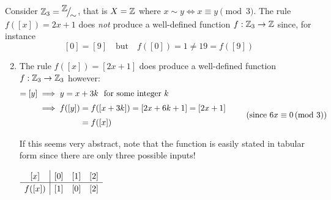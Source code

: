 \begin{examples}{}{}
	\exstart Consider $\mathbb{Z}_3={}^{\textstyle {\mathbb{Z}}}\!\big/_{\textstyle \!{\sim}}$, that is $X=\mathbb{Z}$ where $x\sim y\Longleftrightarrow x\equiv y\pmod 3$. The rule $f([x])=2x+1$ does \emph{not} produce a well-defined function $f:\mathbb{Z}_3\to\mathbb{Z}$ since, for instance
	\[
		[0]=[9]\quad \text{but}\quad f([0])=1\neq 19 =f([9])  
	\]
	
	\begin{enumerate}\setcounter{enumi}{1}
	  \item The rule $f([x])=[2x+1]$ does produce a well-defined function $f:\mathbb{Z}_3\to\mathbb{Z}_3$ however:
	  \begin{align*}
	  	[x]=[y]&\implies y=x+3k\ \ \text{for some integer $k$}\\
	  	&
	  	\begin{array}{@{}r@{}l}
	  		{}\implies f([y])&{}=f([x+3k]) =[2x+6k+1] =[2x+1] \\[3pt]
	  		&{}=f([x])
	  	\end{array}
	  	\tag{since $6x\equiv 0\spmod 3$}
	  \end{align*}
	  \begin{minipage}[t]{0.72\linewidth}\vspace{0pt}
	  	If this seems very abstract, note that the function is easily stated in tabular form since there are only three possible inputs!
	  \end{minipage}
	  \hfill
	  \begin{minipage}[t]{0.25\linewidth}\vspace{-10pt}
	  	\hfill $\def\arraystretch{1.2}
	  	\begin{array}{c|ccc}
	  		[x]&[0]&[1]&[2]\\\hline
	  		f([x])&[1]&[0]&[2]
	  	\end{array}$
	  \end{minipage}


\end{enumerate}
\end{examples}
